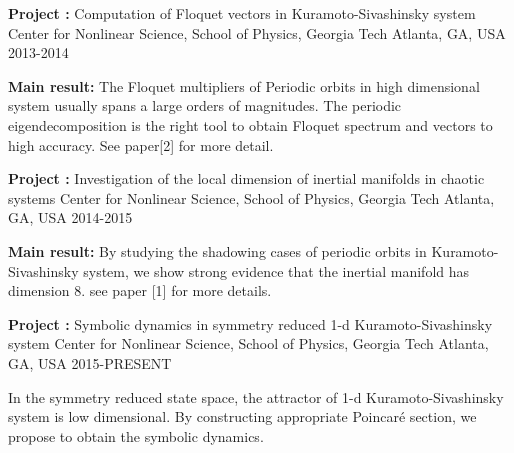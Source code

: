 \begin{cventries}

\cventry
{\textbf{Project :} Computation of Floquet vectors in Kuramoto-Sivashinsky system} 
{Center for Nonlinear Science, School of Physics, Georgia Tech} 
{Atlanta, GA, USA} %
{2013-2014} %
{
  \begin{cvitems}
    \item {\textbf{Main result:} The Floquet multipliers of Periodic orbits in high dimensional system 
        usually spans a large orders of magnitudes. The periodic eigendecomposition is the right tool
        to obtain Floquet spectrum and vectors to high accuracy. See paper[2] for more detail.
      }
  \end{cvitems}
}

\cventry
{\textbf{Project :} Investigation of the local dimension of inertial manifolds in chaotic systems} 
{Center for Nonlinear Science, School of Physics, Georgia Tech} 
{Atlanta, GA, USA} %
{2014-2015} %
{
  \begin{cvitems}
    \item {\textbf{Main result:} By studying the shadowing cases of periodic orbits in
        Kuramoto-Sivashinsky system, we show strong evidence that the inertial manifold has
        dimension 8. see paper [1] for more details.}
  \end{cvitems}
}

\cventry
{\textbf{Project :} Symbolic dynamics in symmetry reduced 1-d Kuramoto-Sivashinsky system} 
{Center for Nonlinear Science, School of Physics, Georgia Tech} 
{Atlanta, GA, USA} %
{2015-PRESENT} %
{
  \begin{cvitems}
      \item {In the symmetry reduced state space, the attractor of  1-d Kuramoto-Sivashinsky system
          is low dimensional. By constructing appropriate Poincar\'e section, we propose to obtain the
          symbolic dynamics. }
  \end{cvitems}
}



\end{cventries}
